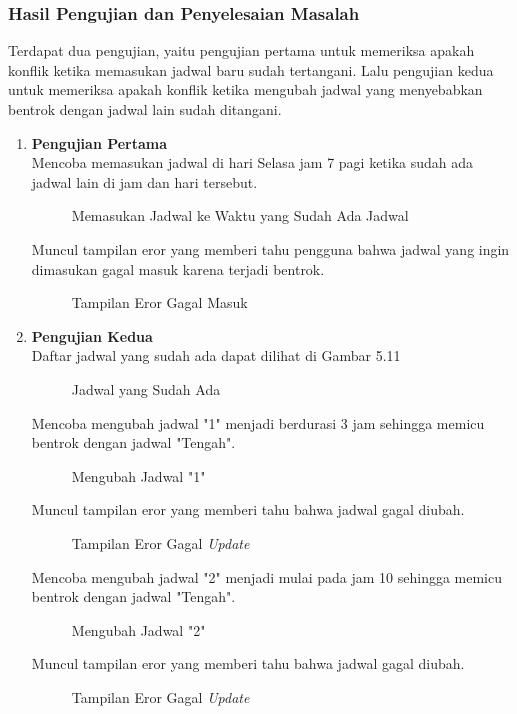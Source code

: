 \subsubsection{Hasil Pengujian dan Penyelesaian Masalah}
Terdapat dua pengujian, yaitu pengujian pertama untuk memeriksa apakah konflik ketika memasukan jadwal baru sudah tertangani. Lalu pengujian kedua untuk memeriksa apakah konflik ketika mengubah jadwal yang menyebabkan bentrok dengan jadwal lain sudah ditangani.
\begin{enumerate}
	\item \textbf{Pengujian Pertama}\\
	Mencoba memasukan jadwal di hari Selasa jam 7 pagi ketika sudah ada jadwal lain di jam dan hari tersebut.
\begin{figure} [H]
	\centering  
	\caption[Memasukan Jadwal ke Waktu yang Sudah Ada Jadwal]{Memasukan Jadwal ke Waktu yang Sudah Ada Jadwal} 
\end{figure}
	Muncul tampilan eror yang memberi tahu pengguna bahwa jadwal yang ingin dimasukan gagal masuk karena terjadi bentrok.
\begin{figure} [H]
	\centering  
	\caption[Tampilan Eror Gagal Masuk]{Tampilan Eror Gagal Masuk} 
\end{figure}

	\item \textbf{Pengujian Kedua}\\
	Daftar jadwal yang sudah ada dapat dilihat di Gambar 5.11
	\begin{figure} [H]
	\centering  
	\caption[Jadwal yang Sudah Ada]{Jadwal yang Sudah Ada} 
	\end{figure}
	Mencoba mengubah jadwal "1" menjadi berdurasi 3 jam sehingga memicu bentrok dengan jadwal "Tengah".
	\begin{figure} [H]
	\centering  
	\caption[Mengubah Jadwal "1"]{Mengubah Jadwal "1"} 
	\end{figure}
	Muncul tampilan eror yang memberi tahu bahwa jadwal gagal diubah.
	\begin{figure} [H]
	\centering  
	\caption[Tampilan Eror Gagal \textit{Update}]{Tampilan Eror Gagal \textit{Update}} 
	\end{figure}
	Mencoba mengubah jadwal "2" menjadi mulai pada jam 10 sehingga memicu bentrok dengan jadwal "Tengah".
	\begin{figure} [H]
	\centering  
	\caption[Mengubah Jadwal "2"]{Mengubah Jadwal "2"} 
	\end{figure}
	Muncul tampilan eror yang memberi tahu bahwa jadwal gagal diubah.
	\begin{figure} [H]
	\centering  
	\caption[Tampilan Eror Gagal \textit{Update}]{Tampilan Eror Gagal \textit{Update}} 
	\end{figure}
\end{enumerate}

